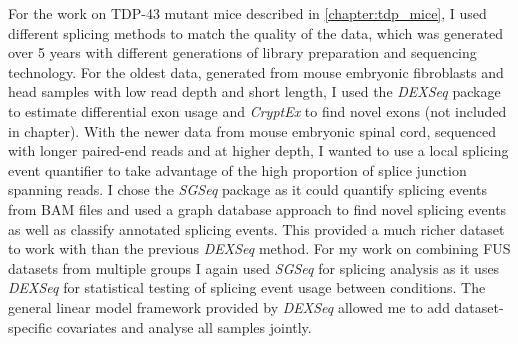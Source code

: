 For the work on TDP-43 mutant mice described in \autoref{chapter:tdp_mice}, I used different splicing methods to match the quality of the data, which was generated over 5 years with different generations of library preparation and sequencing technology. For the oldest data, generated from mouse embryonic fibroblasts and head samples with low read depth and short length, I used the \textit{DEXSeq} package to estimate differential exon usage and \textit{CryptEx} to find novel exons (not included in chapter).
With the newer data from mouse embryonic spinal cord, sequenced with longer paired-end reads and at higher depth, I wanted to use a local splicing event quantifier to take advantage of the high proportion of splice junction spanning reads. 
I chose the \textit{SGSeq} package as it could quantify splicing events from BAM files and used a graph database approach to find novel splicing events as well as classify annotated splicing events. This provided a much richer dataset to work with than the previous \textit{DEXSeq} method.
For my work on combining FUS datasets from multiple groups I again used \textit{SGSeq} for splicing analysis as it uses \textit{DEXSeq} for statistical testing of splicing event usage between conditions. The general linear model framework provided by \textit{DEXSeq} allowed me to add dataset-specific covariates and analyse all samples jointly.


